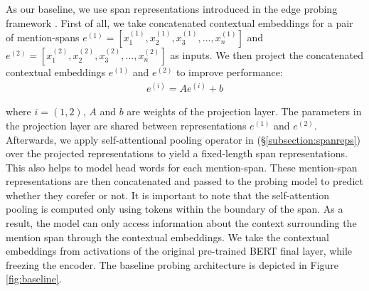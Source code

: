 \documentclass[11pt]{article}
\begin{document}



As our baseline, we use span representations introduced in the edge probing framework \parencite{tenney2019context}. First of all, we take concatenated contextual embeddings for a pair of mention-spans $e^{(1)} = [x_{1}^{(1)}, x_{2}^{(1)}, x_{3}^{(1)}, ..., x_{n}^{(1)}]$ and $e^{(2)} = [x_{1}^{(2)}, x_{2}^{(2)}, x_{3}^{(2)}, ..., x_{n}^{(2)}]$ as inputs. We then project the concatenated contextual embeddings $e^{(1)}$ and $e^{(2)}$ to improve performance:
\begin{align}
e^{(i)} = Ae^{(i)} + b
\end{align}

where $i = (1,2)$, $A$ and $b$ are weights of the projection layer. The parameters in the projection layer are shared between representations $e^{(1)}$ and $e^{(2)}$. Afterwards, we apply self-attentional pooling operator in (\S \ref{subsection:spanreps}) over the projected representations to yield a fixed-length span representations. This also helps to model head words for each mention-span. These mention-span representations are then concatenated and passed to the probing model to predict whether they corefer or not. It is important to note that the self-attention pooling is computed only using tokens within the boundary of the span. As a result, the model can only access information about the context surrounding the mention span through the contextual embeddings. We take the contextual embeddings from activations of the original pre-trained BERT final layer, while freezing the encoder. The baseline probing architecture is depicted in Figure \ref{fig:baseline}. 
\end{document}
